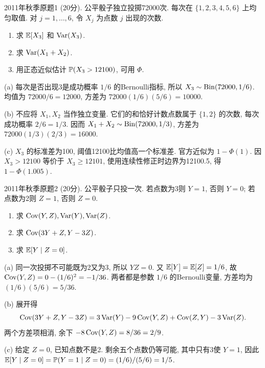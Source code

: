 \begin{exercise}\label{m2:2011f:q1}
2011年秋季原题1 (20分). 公平骰子独立投掷72000次. 每次在 $\{1,2,3,4,5,6\}$ 上均匀取值. 对 $j=1,\ldots,6$, 令 $X_j$ 为点数 $j$ 出现的次数.
\begin{enumerate}
\item[(a)]\label{m2:2011f:q1:a} 求 $\mathbb E[X_3]$ 和 $\operatorname{Var}(X_3)$.
\item[(b)]\label{m2:2011f:q1:b} 求 $\operatorname{Var}(X_1+X_2)$.
\item[(c)]\label{m2:2011f:q1:c} 用正态近似估计 $\mathbb P(X_3>12100)$, 可用 $\Phi$.
\end{enumerate}
\end{exercise}
\begin{solution}
(a) 每次是否出现3是成功概率 $1/6$ 的Bernoulli指标, 所以 $X_3\sim\operatorname{Bin}(72000,1/6)$. 均值为 $72000/6=12000$, 方差为 $72000(1/6)(5/6)=10000$.

(b) 不应将 $X_1,X_2$ 当作独立变量. 它们的和恰好计数点数属于 $\{1,2\}$ 的次数, 每次成功概率 $2/6=1/3$. 因而 $X_1+X_2\sim\operatorname{Bin}(72000,1/3)$, 方差为 $72000(1/3)(2/3)=16000$.

(c) $X_3$ 的标准差为100, 阈值12100比均值高一个标准差. 官方近似为 $1-\Phi(1)$. 因 $X_3>12100$ 等价于 $X_3\ge12101$, 使用连续性修正时边界为12100.5, 得 $1-\Phi(1.005)$.
\end{solution}

\begin{exercise}\label{m2:2011f:q2}
2011年秋季原题2 (20分). 公平骰子只投一次. 若点数为3则 $Y=1$, 否则 $Y=0$; 若点数为2则 $Z=1$, 否则 $Z=0$.
\begin{enumerate}
\item[(a)]\label{m2:2011f:q2:a} 求 $\operatorname{Cov}(Y,Z),\operatorname{Var}(Y),\operatorname{Var}(Z)$.
\item[(b)]\label{m2:2011f:q2:b} 求 $\operatorname{Cov}(3Y+Z,Y-3Z)$.
\item[(c)]\label{m2:2011f:q2:c} 求 $\mathbb E[Y\mid Z=0]$.
\end{enumerate}
\end{exercise}
\begin{solution}
(a) 同一次投掷不可能既为2又为3, 所以 $YZ=0$. 又 $\mathbb E[Y]=\mathbb E[Z]=1/6$, 故 $\operatorname{Cov}(Y,Z)=0-(1/6)^2=-1/36$. 两者都是参数 $1/6$ 的Bernoulli变量, 方差均为 $(1/6)(5/6)=5/36$.

(b) 展开得
\[
\operatorname{Cov}(3Y+Z,Y-3Z)=3\operatorname{Var}(Y)-9\operatorname{Cov}(Y,Z)+\operatorname{Cov}(Z,Y)-3\operatorname{Var}(Z).
\]
两个方差项相消, 余下 $-8\operatorname{Cov}(Y,Z)=8/36=2/9$.

(c) 给定 $Z=0$, 已知点数不是2. 剩余五个点数仍等可能, 其中只有3使 $Y=1$, 因此 $\mathbb E[Y\mid Z=0]=\mathbb P(Y=1\mid Z=0)=(1/6)/(5/6)=1/5$.
\end{solution}

